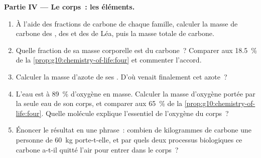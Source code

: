 \begin{problem}
\medskip
\noindent\textbf{Partie IV --- Le corps~: les éléments.}
\begin{enumerate}[resume]
  \item À l'aide des fractions de carbone de chaque famille, calculer
        la masse de carbone des , des  et des 
        de Léa, puis la masse totale de carbone.
  \item Quelle fraction de sa masse corporelle est du carbone~?
        Comparer aux 18.5~\% de la
        \cref{prop:g10:chemistry-of-life:four} et commenter l'accord.
  \item Calculer la masse d'azote de ses . D'où venait
        finalement cet azote~?
  \item L'eau est à 89~\% d'oxygène en masse. Calculer la masse
        d'oxygène portée par la seule eau de son corps, et comparer
        aux 65~\% de la \cref{prop:g10:chemistry-of-life:four}. Quelle
        molécule explique l'essentiel de l'oxygène du corps~?
  \item Énoncer le résultat en une phrase~: combien de kilogrammes de
        carbone une personne de \qty{60}{kg} porte-t-elle, et par
        quels deux processus biologiques ce carbone a-t-il quitté
        l'air pour entrer dans le corps~?
\end{enumerate}
\end{problem}
